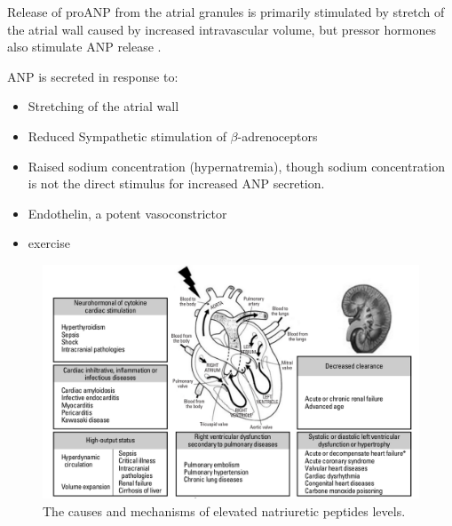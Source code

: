 \documentclass[14pt,a4paper,onecolumn]{extarticle}
\begin{document}
Release of proANP from the atrial granules is primarily stimulated by stretch of the atrial wall caused by increased intravascular volume, but pressor hormones also stimulate ANP release \citep{Ruskoaho2003}.

ANP is secreted in response to:
    \begin{itemize}
        \item Stretching of the atrial wall \citep{Widmaier2008}
        \item Reduced Sympathetic stimulation of $\beta$-adrenoceptors
        \item Raised sodium concentration (hypernatremia), though sodium concentration is not the direct stimulus for increased ANP secretion. \citep{Widmaier2008}
        \item Endothelin, a potent vasoconstrictor
        \item exercise \citep{Kokkonen2002}
    \end{itemize}


\begin{figure}
    \centering
    \includegraphics[scale=0.3]{../../images/NP_causes.png}
    \small\caption{The causes and mechanisms of elevated natriuretic peptides levels.}
    \label{NP_causes}
\end{figure}
\end{document}
